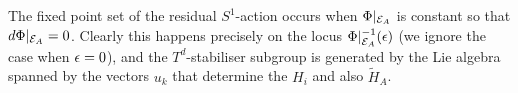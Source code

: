 The fixed point set of the residual $S^{1}$-action occurs when $\Phi|_{\mathcal{E}_{A}}$ is constant so that $d\Phi|_{\mathcal{E}_{A}} = 0$. Clearly this happens precisely on the locus $\Phi|_{\mathcal{E}_{A}}^{-1}(\epsilon)$ (we ignore the case when $\epsilon = 0$), and the $T^{d}$-stabiliser subgroup is generated by the Lie algebra spanned by the vectors $u_{k}$ that determine the $H_{i}$ and also $\tilde{H}_{A}$.




